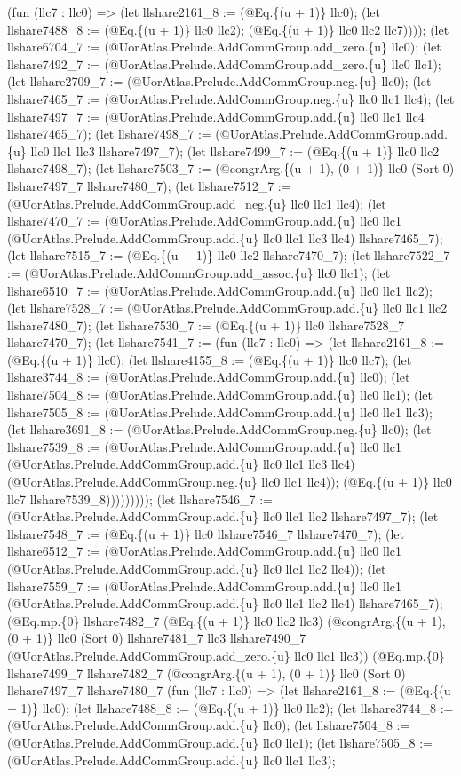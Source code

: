 \documentclass[11pt]{article}
\begin{document}
(fun (llc7 : llc0) => (let llshare2161\_8 := (@Eq.\{(u + 1)\} llc0); (let llshare7488\_8 := (@Eq.\{(u + 1)\} llc0 llc2); (@Eq.\{(u + 1)\} llc0 llc2 llc7)))); (let llshare6704\_7 := (@UorAtlas.Prelude.AddCommGroup.add\_zero.\{u\} llc0); (let llshare7492\_7 := (@UorAtlas.Prelude.AddCommGroup.add\_zero.\{u\} llc0 llc1); (let llshare2709\_7 := (@UorAtlas.Prelude.AddCommGroup.neg.\{u\} llc0); (let llshare7465\_7 := (@UorAtlas.Prelude.AddCommGroup.neg.\{u\} llc0 llc1 llc4); (let llshare7497\_7 := (@UorAtlas.Prelude.AddCommGroup.add.\{u\} llc0 llc1 llc4 llshare7465\_7); (let llshare7498\_7 := (@UorAtlas.Prelude.AddCommGroup.add.\{u\} llc0 llc1 llc3 llshare7497\_7); (let llshare7499\_7 := (@Eq.\{(u + 1)\} llc0 llc2 llshare7498\_7); (let llshare7503\_7 := (@congrArg.\{(u + 1), (0 + 1)\} llc0 (Sort 0) llshare7497\_7 llshare7480\_7); (let llshare7512\_7 := (@UorAtlas.Prelude.AddCommGroup.add\_neg.\{u\} llc0 llc1 llc4); (let llshare7470\_7 := (@UorAtlas.Prelude.AddCommGroup.add.\{u\} llc0 llc1 (@UorAtlas.Prelude.AddCommGroup.add.\{u\} llc0 llc1 llc3 llc4) llshare7465\_7); (let llshare7515\_7 := (@Eq.\{(u + 1)\} llc0 llc2 llshare7470\_7); (let llshare7522\_7 := (@UorAtlas.Prelude.AddCommGroup.add\_assoc.\{u\} llc0 llc1); (let llshare6510\_7 := (@UorAtlas.Prelude.AddCommGroup.add.\{u\} llc0 llc1 llc2); (let llshare7528\_7 := (@UorAtlas.Prelude.AddCommGroup.add.\{u\} llc0 llc1 llc2 llshare7480\_7); (let llshare7530\_7 := (@Eq.\{(u + 1)\} llc0 llshare7528\_7 llshare7470\_7); (let llshare7541\_7 := (fun (llc7 : llc0) => (let llshare2161\_8 := (@Eq.\{(u + 1)\} llc0); (let llshare4155\_8 := (@Eq.\{(u + 1)\} llc0 llc7); (let llshare3744\_8 := (@UorAtlas.Prelude.AddCommGroup.add.\{u\} llc0); (let llshare7504\_8 := (@UorAtlas.Prelude.AddCommGroup.add.\{u\} llc0 llc1); (let llshare7505\_8 := (@UorAtlas.Prelude.AddCommGroup.add.\{u\} llc0 llc1 llc3); (let llshare3691\_8 := (@UorAtlas.Prelude.AddCommGroup.neg.\{u\} llc0); (let llshare7539\_8 := (@UorAtlas.Prelude.AddCommGroup.add.\{u\} llc0 llc1 (@UorAtlas.Prelude.AddCommGroup.add.\{u\} llc0 llc1 llc3 llc4) (@UorAtlas.Prelude.AddCommGroup.neg.\{u\} llc0 llc1 llc4)); (@Eq.\{(u + 1)\} llc0 llc7 llshare7539\_8))))))))); (let llshare7546\_7 := (@UorAtlas.Prelude.AddCommGroup.add.\{u\} llc0 llc1 llc2 llshare7497\_7); (let llshare7548\_7 := (@Eq.\{(u + 1)\} llc0 llshare7546\_7 llshare7470\_7); (let llshare6512\_7 := (@UorAtlas.Prelude.AddCommGroup.add.\{u\} llc0 llc1 (@UorAtlas.Prelude.AddCommGroup.add.\{u\} llc0 llc1 llc2 llc4)); (let llshare7559\_7 := (@UorAtlas.Prelude.AddCommGroup.add.\{u\} llc0 llc1 (@UorAtlas.Prelude.AddCommGroup.add.\{u\} llc0 llc1 llc2 llc4) llshare7465\_7); (@Eq.mp.\{0\} llshare7482\_7 (@Eq.\{(u + 1)\} llc0 llc2 llc3) (@congrArg.\{(u + 1), (0 + 1)\} llc0 (Sort 0) llshare7481\_7 llc3 llshare7490\_7 (@UorAtlas.Prelude.AddCommGroup.add\_zero.\{u\} llc0 llc1 llc3)) (@Eq.mp.\{0\} llshare7499\_7 llshare7482\_7 (@congrArg.\{(u + 1), (0 + 1)\} llc0 (Sort 0) llshare7497\_7 llshare7480\_7 (fun (llc7 : llc0) => (let llshare2161\_8 := (@Eq.\{(u + 1)\} llc0); (let llshare7488\_8 := (@Eq.\{(u + 1)\} llc0 llc2); (let llshare3744\_8 := (@UorAtlas.Prelude.AddCommGroup.add.\{u\} llc0); (let llshare7504\_8 := (@UorAtlas.Prelude.AddCommGroup.add.\{u\} llc0 llc1); (let llshare7505\_8 := (@UorAtlas.Prelude.AddCommGroup.add.\{u\} llc0 llc1 llc3); 
\end{document}
